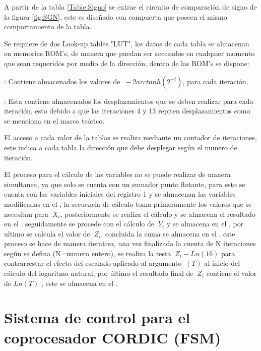 A partir de la tabla \ref{Table:Signo} se extrae el circuito de comparación de signo de la figura \ref{fig:SGN}, este es diseñado con compuerta  que poseen el mismo comportamiento de la tabla. 


Se requiere de dos Look-up tables "LUT", los datos de cada tabla se almacenan en memorias ROM's, de manera que puedan ser accesados en cualquier momento que sean requeridos por medio de la dirección, dentro de las ROM's se dispone:   

\begin{compactitem}

\item {}: Contiene almacenados los valores de $\ -2arctanh \left( 2^{-i} \right) $, para cada iteración.  
\item {}: Esta contiene almacenados los desplazamientos que se deben realizar para cada iteración, esto debido a que las iteraciones 4 y 13 repiten desplazamientos como se menciona en el marco teórico. 

\end{compactitem}

El acceso a cada valor de la tablas se realiza mediante un contador de iteraciones, este indica a cada tabla la dirección que debe desplegar según el numero de iteración.  

El proceso para el cálculo de las variables no se puede realizar de manera simultanea, ya que solo se cuenta con un sumador punto flotante, para esto se cuenta con las variables iniciales del registro 1 y se almacenan las variables modificadas en el , la secuencia de cálculo toma primeramente los valores que se necesitan para  $\ X_i $, posteriormente se realiza el cálculo y se almacena el resultado en el , seguidamente se procede con el cálculo de $\ Y_i $ y se almacena en el , por ultimo se calcula el valor de $\ Z_i $, concluida la suma se almacena en el , este proceso se hace de manera iterativa, una vez finalizada la cuenta de N iteraciones según se defina (N=numero entero), se realiza la resta $\ Z_i - Ln\left(16\right) $ para contrarrestar el efecto del escalado aplicado al argumento $\ \left(T\right) $ al inicio del cálculo del logaritmo natural, por último el resultado final de $\ Z_i $ contiene el valor de $Ln \left(T \right)$ , este se almacena en el .

\section{Sistema de control para el coprocesador CORDIC (FSM)}

